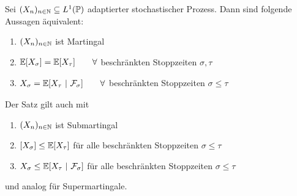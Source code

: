 \begin{theorem}\enter\label{theorem3.4}
Sei $(X_n)_{n\in\mathbb{N}}\subseteq L^1(\mathbb{P})$ adaptierter stochastischer Prozess. Dann sind folgende Aussagen äquivalent:
\begin{enumerate}[label=(\alph*)]
\item $(X_n)_{n\in\mathbb{N}}$ ist Martingal
\item $\begin{aligned}
\mathbb{E}[X_\sigma]=\mathbb{E}[X_\tau]\qquad\forall
\end{aligned}$ beschränkten Stoppzeiten $\sigma,\tau$
\item $\begin{aligned}
X_\sigma=\mathbb{E}[X_\tau~|~\mathcal{F}_\sigma]\qquad\forall
\end{aligned}$  beschränkten Stoppzeiten $\sigma\leq\tau$
\end{enumerate}
\end{theorem}

\begin{bemerkung}
Der Satz gilt auch mit 
\begin{enumerate}[label=(\alph*')]
\item $(X_n)_{n\in\mathbb{N}}$ ist Submartingal
\item $[X_\sigma]\leq\mathbb{E}[X_\tau]$ für alle beschränkten Stoppzeiten $\sigma\leq\tau$
\item $X_\sigma\leq\mathbb{E}[X_\tau~|~\mathcal{F}_\sigma]$ für alle beschränkten Stoppzeiten $\sigma\leq\tau$
\end{enumerate}
und analog für Supermartingale.
\end{bemerkung}

